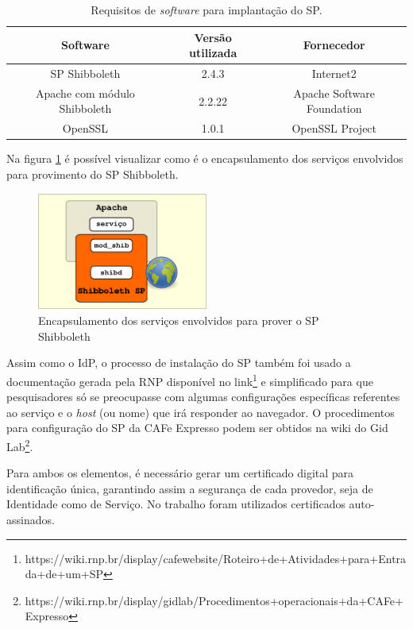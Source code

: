 \begin{table}[!htpb]
   \begin{small}
	\centering
	\begin{tabular}{|c|c|c|} \hline
		Software & Versão utilizada & Fornecedor \\ \hline
		SP Shibboleth & 2.4.3 & Internet2\\ \hline
		Apache com módulo Shibboleth & 2.2.22 & Apache Software Foundation\\ \hline
		OpenSSL & 1.0.1 & OpenSSL Project\\ \hline
	\end{tabular}
	\caption{Requisitos de \textit{software} para implantação do SP.}
	\label{tab_3}
  \end{small}
\end{table}

Na figura \ref{fig_11} é possível visualizar como é o encapsulamento dos serviços envolvidos para provimento do SP Shibboleth.

\begin{figure}[!htpb]
 \centering
 \includegraphics[width=0.5\textwidth]{figuras/vm-sp.png}
 \caption{Encapsulamento dos serviços envolvidos para prover o SP Shibboleth}
 \label{fig_11}
\end{figure}

Assim como o IdP, o processo de instalação do SP também foi usado a documentação gerada pela RNP disponível no link\footnote{https://wiki.rnp.br/display/cafewebsite/Roteiro+de+Atividades+para+Entrada+de+um+SP} e simplificado para que pesquisadores só se preocupasse com algumas configurações específicas referentes ao serviço e o \textit{host} (ou nome) que irá responder ao navegador. O procedimentos para configuração do SP da CAFe Expresso podem ser obtidos na wiki do Gid Lab\footnote{https://wiki.rnp.br/display/gidlab/Procedimentos+operacionais+da+CAFe+Expresso}.

Para ambos os elementos, é necessário gerar um certificado digital para identificação única, garantindo assim a segurança de cada provedor, seja de Identidade como de Serviço. No trabalho foram utilizados certificados auto-assinados.

